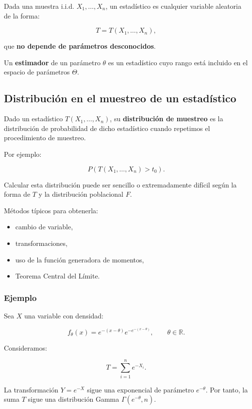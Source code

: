 \documentclass[
]{article}
\providecommand{\tightlist}{%
  \setlength{\itemsep}{0pt}\setlength{\parskip}{0pt}}
\begin{document}
Dada una muestra i.i.d. \(X_1,\ldots,X_n\), un estadístico es cualquier variable aleatoria de la forma:

\[
T = T(X_1,\ldots,X_n),
\]

que \textbf{no depende de parámetros desconocidos}.

Un \textbf{estimador} de un parámetro \(\theta\) es un estadístico cuyo rango está incluido en el espacio de parámetros \(\Theta\).

\subsection{Distribución en el muestreo de un estadístico}\label{distribuciuxf3n-en-el-muestreo-de-un-estaduxedstico}

Dado un estadístico \(T(X_1,\ldots,X_n)\), su \textbf{distribución de muestreo} es la distribución de probabilidad de dicho estadístico cuando repetimos el procedimiento de muestreo.

Por ejemplo:

\[
P\left(T(X_1,\ldots,X_n)>t_0\right).
\]

Calcular esta distribución puede ser sencillo o extremadamente difícil según la forma de \(T\) y la distribución poblacional \(F\).

Métodos típicos para obtenerla:

\begin{itemize}
\tightlist
\item
  cambio de variable,
\item
  transformaciones,
\item
  uso de la función generadora de momentos,
\item
  Teorema Central del Límite.
\end{itemize}

\subsubsection{Ejemplo}\label{ejemplo-6}

Sea \(X\) una variable con densidad:

\[
f_\theta(x) = e^{-(x-\theta)} e^{-e^{-(x-\theta)}},\qquad \theta\in\mathbb{R}.
\]

Consideramos:

\[
T = \sum_{i=1}^n e^{-X_i}.
\]

La transformación \(Y=e^{-X}\) sigue una exponencial de parámetro \(e^{-\theta}\). Por tanto, la suma \(T\) sigue una distribución Gamma \(\Gamma(e^{-\theta}, n)\).
\end{document}
